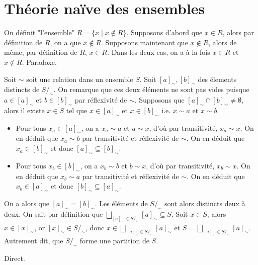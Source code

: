 \section{Théorie naïve des ensembles}

\begin{exercice}
    On définit "l'ensemble" $R = \{x \mid x \notin R\}$.
    Supposons d'abord que $x \in R$, alors par définition de $R$, on a que $x \notin R$. Supposons maintenant 
    que $x \notin R$, alors de même, par définition de $R$, $x \in R$. Dans les deux cas, on a à la fois $x \in R$ et $x \notin R$. Paradoxe.
\end{exercice}

\begin{exercice}
    Soit $\sim$ soit une relation dans un ensemble $S$.
    Soit $[a]_\sim, [b]_\sim$ des élements distincts de $S /_\sim$. On remarque que ces deux éléments ne sont pas vides puisque $a \in [a]_{\sim}$
    et $b \in [b]_\sim$ par réflexivité de $\sim$. Supposons que $[a]_\sim \cap [b]_\sim \neq \emptyset$, alors il existe $x \in S$ tel que $x \in [a]_\sim$ et $x \in [b]_\sim$ i.e. $x \sim a$ et $x \sim b$.

    \begin{itemize}
        \item Pour tous $x_a \in [a]_\sim$, on a $x_a \sim a$ et $a \sim x$, d'où par transitivité, $x_a \sim x$. 
        On en déduit que $x_a \sim b$ par transitivité et réflexivité de $\sim$. On en déduit que $x_a \in [b]_\sim$ et donc $[a]_\sim \subseteq [b]_\sim$.
        \item Pour tous $x_b \in [b]_\sim$, on a $x_b \sim b$ et $b \sim x$, d'où par transitivité, $x_b \sim x$. 
        On en déduit que $x_b \sim a$ par transitivité et réflexivité de $\sim$. On en déduit que $x_b \in [a]_\sim$ et donc $[b]_\sim \subseteq [a]_\sim$.
    \end{itemize}
    On a alors que $[a]_\sim = [b]_\sim$. Les éléments de $S /_\sim$ sont alors distincts deux à deux. On sait par définition que $\bigsqcup_{[a]_\sim \in S /_\sim} [a]_\sim \subseteq S$.
    Soit $x \in S$, alors $x \in [x]_\sim$, or $[x]_\sim \in S /_\sim$, donc $x \in \bigsqcup_{[a]_\sim \in S /_\sim} [a]_\sim$ et $S = \bigsqcup_{[a]_\sim \in S /_\sim} [a]_\sim$. Autrement dit, que $S/_\sim$ forme une partition de $S$.
\end{exercice}

\begin{exercice}
    Direct.
\end{exercice}

